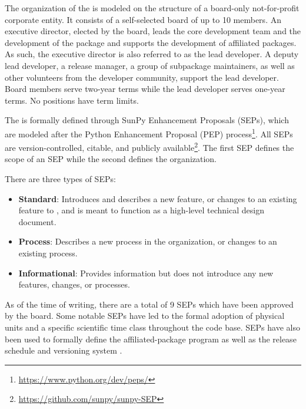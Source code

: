 The organization of the \sunpyproj is modeled on the structure of a board-only not-for-profit corporate entity.
It consists of a self-selected board of up to 10 members.
An executive director, elected by the board, leads the core development team and the development of the \sunpypkg  package and supports the development of affiliated packages.
As such, the executive director is also referred to as the lead developer.
A deputy lead developer, a release manager, a group of subpackage maintainers, as well as other volunteers from the developer community, support the lead developer.
Board members serve two-year terms while the lead developer serves one-year terms. No positions have term limits.

The \sunpyproj is formally defined through SunPy Enhancement Proposals (SEPs), which are modeled after the Python Enhancement Proposal (PEP) process\footnote{\url{https://www.python.org/dev/peps/}}.
All SEPs are version-controlled, citable, and publicly available\footnote{\url{https://github.com/sunpy/sunpy-SEP}}.
The first SEP \citep[SEP-0001,][]{sep-0001} defines the scope of an SEP \citep[similar to][]{ape-0001} while the second \citep[SEP-0002,][]{sep-0002} defines the  \sunpyproj organization.

There are three types of SEPs:
\begin{itemize}
    \item \textbf{Standard}: Introduces and describes a new feature, or changes to an existing feature to \sunpypkg, and is meant to function as a high-level technical design document.
    \item \textbf{Process}: Describes a new process in the organization, or changes to an existing process.
    \item \textbf{Informational}: Provides information but does not introduce any new features, changes, or processes.
\end{itemize}

As of the time of writing, there are a total of 9 SEPs which have been approved by the board.
Some notable SEPs have led to the formal adoption of physical units \citep[SEP-0003,][see \autoref{sec:units}]{sep-0003} and a specific scientific time class \citep[SEP-0008,][see \autoref{sec:units}]{sep-0008} throughout the code base.
SEPs have also been used to formally define the affiliated-package program \citep[SEP-0004,][see \autoref{sec:affil_package}]{sep-0004} as well as the release schedule and versioning system \citep[SEP-0009,][see \autoref{sec:release}]{sep-0009}.
